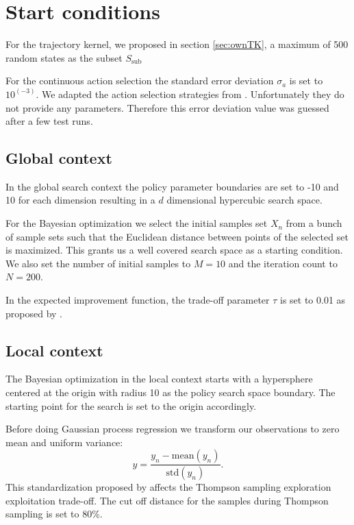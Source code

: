 \section{Start conditions}

For the trajectory kernel, we proposed in section \ref{sec:ownTK}, a maximum of 500 random states as the subset $S_{\text{sub}}$

For the continuous action selection the standard error deviation $\sigma_a$ is set to $10^(-3)$. We adapted the action selection strategies from \cite{wilson}. Unfortunately they do not provide any parameters. Therefore this error deviation value was guessed after a few test runs.

\subsection{Global context}

In the global search context the policy parameter boundaries are set to -10 and 10 for each dimension resulting in a $d$ dimensional hypercubic search space.

For the Bayesian optimization we select the initial samples set $X_n$ from a bunch of sample sets such that the Euclidean distance between points of the selected set is maximized. This grants us a well covered search space as a starting condition. We also set the number of initial samples to $M = 10$ and the iteration count to $N = 200$.

In the expected improvement function, the trade-off parameter $\tau$ is set to 0.01 as proposed by \cite{brochu2010tutorial}.
\subsection{Local context}
The Bayesian optimization in the local context starts with a hypersphere centered at the origin with radius 10 as the policy search space boundary. The starting point for the search is set to the origin accordingly.


Before doing Gaussian process regression we transform our observations to zero mean and uniform variance:
$$y = \frac{y_{n}-\mathrm{mean}(y_{n})}{\mathrm{std}(y_{n})}.$$
This standardization proposed by \cite{akrour2017local} affects the Thompson sampling exploration exploitation trade-off. The cut off distance for the samples during Thompson sampling is set to 80\%.



